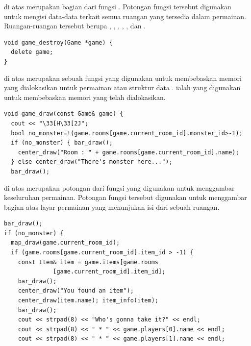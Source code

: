 \documentclass[../main.tex]{subfiles}
\begin{document}
{\Script} di atas merupakan bagian dari fungsi . Potongan fungsi tersebut digunakan untuk mengisi data-data terkait semua ruangan yang tersedia dalam permainan. Ruangan-ruangan tersebut berupa , , , , ,  dan .

\begin{code}
\begin{verbatim}
void game_destroy(Game *game) {
  delete game;
}
\end{verbatim}
\end{code}

{\Script} di atas merupakan sebuah fungsi yang digunakan untuk membebaskan memori yang dialokasikan untuk permainan atau struktur data . {\Statement}  ialah {\statement} yang digunakan untuk membebaskan memori yang telah dialokasikan.

\begin{code}
\begin{verbatim}
void game_draw(const Game& game) {
  cout << "\33[H\33[2J";
  bool no_monster=!(game.rooms[game.current_room_id].monster_id>-1);
  if (no_monster) { bar_draw();
    center_draw("Room : " + game.rooms[game.current_room_id].name);
  } else center_draw("There's monster here...");
  bar_draw();
\end{verbatim}
\end{code}

{\Script} di atas merupakan potongan dari fungsi  yang digunakan untuk menggambar keseluruhan permainan. Potongan fungsi tersebut digunakan untuk menggambar bagian atas layar permainan yang menunjukan isi dari sebuah ruangan.

\begin{code}
\begin{verbatim}
bar_draw();
if (no_monster) {
  map_draw(game.current_room_id);
  if (game.rooms[game.current_room_id].item_id > -1) {
    const Item& item = game.items[game.rooms
              [game.current_room_id].item_id];
    bar_draw();
    center_draw("You found an item");
    center_draw(item.name); item_info(item);
    bar_draw();
    cout << strpad(8) << "Who's gonna take it?" << endl;
    cout << strpad(8) << " * " << game.players[0].name << endl;
    cout << strpad(8) << " * " << game.players[1].name << endl;
\end{verbatim}
\end{code}
\end{document}

